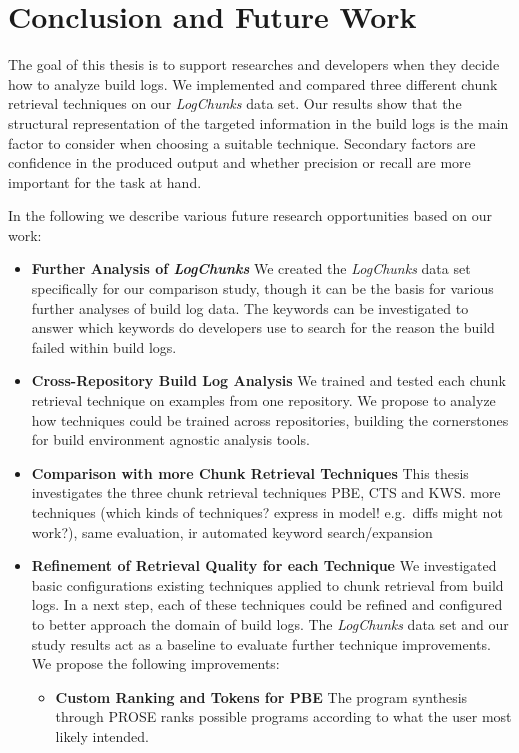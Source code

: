 \documentclass[\myrootdir/main.tex]{subfiles}
\begin{document}
\chapter{Conclusion and Future Work}
\label{sec:conclusion-fw}
The goal of this thesis is to support researches and developers when they decide how to analyze build logs.
We implemented and compared three different chunk retrieval techniques on our \emph{LogChunks} data set.
Our results show that the structural representation of the targeted information in the build logs is the main factor to consider when choosing a suitable technique.
Secondary factors are confidence in the produced output and whether precision or recall are more important for the task at hand.

In the following we describe various future research opportunities based on our work:
\begin{itemize}
  \item \textbf{Further Analysis of \emph{LogChunks}} We created the \emph{LogChunks} data set specifically for our comparison study, though it can be the basis for various further analyses of build log data.
  The keywords can be investigated to answer which keywords do developers use to search for the reason the build failed within build logs.
  \item \textbf{Cross-Repository Build Log Analysis} We trained and tested each chunk retrieval technique on examples from one repository.
  We propose to analyze how techniques could be trained across repositories, building the cornerstones for build environment agnostic analysis tools.
  \item \textbf{Comparison with more Chunk Retrieval Techniques} This thesis investigates the three chunk retrieval techniques PBE, CTS and KWS. more techniques (which kinds of techniques? express in model! e.g.\ diffs might not work?), same evaluation, ir automated keyword search/expansion
  \item \textbf{Refinement of Retrieval Quality for each Technique} We investigated basic configurations existing techniques applied to chunk retrieval from build logs.
  In a next step, each of these techniques could be refined and configured to better approach the domain of build logs.
  The \emph{LogChunks} data set and our study results act as a baseline to evaluate further technique improvements.
  We propose the following improvements:
    \begin{itemize}
      \item \textbf{Custom Ranking and Tokens for PBE} The program synthesis through PROSE ranks possible programs according to what the user most likely intended.

\end{itemize}
\end{itemize}
\end{document}
